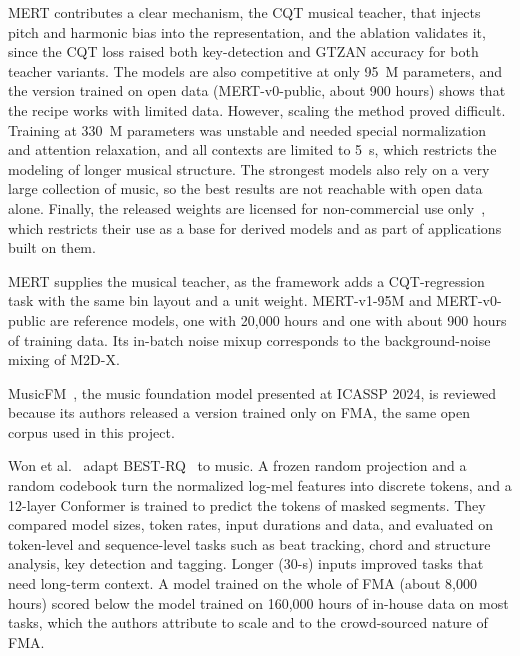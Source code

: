 \documentclass{FastFyp}
\begin{document}
\lrcritical
MERT contributes a clear mechanism, the CQT musical teacher, that injects pitch and harmonic bias into the representation, and the ablation validates it, since the CQT loss raised both key-detection and GTZAN accuracy for both teacher variants. The models are also competitive at only 95~M parameters, and the version trained on open data (MERT-v0-public, about 900 hours) shows that the recipe works with limited data. However, scaling the method proved difficult. Training at 330~M parameters was unstable and needed special normalization and attention relaxation, and all contexts are limited to 5~s, which restricts the modeling of longer musical structure. The strongest models also rely on a very large collection of music, so the best results are not reachable with open data alone. Finally, the released weights are licensed for non-commercial use only~\cite{ref:MERTCard}, which restricts their use as a base for derived models and as part of applications built on them.

\lrrelation
MERT supplies the musical teacher, as the framework adds a CQT-regression task with the same bin layout and a unit weight. MERT-v1-95M and MERT-v0-public are reference models, one with 20,000 hours and one with about 900 hours of training data. Its in-batch noise mixup corresponds to the background-noise mixing of M2D-X.

MusicFM~\cite{ref:Won:2024musicfm}, the music foundation model presented at ICASSP 2024, is reviewed because its authors released a version trained only on FMA, the same open corpus used in this project.

\lrsummary
Won et al.~\cite{ref:Won:2024musicfm} adapt BEST-RQ~\cite{ref:Chiu:2022bestrq} to music. A frozen random projection and a random codebook turn the normalized log-mel features into discrete tokens, and a 12-layer Conformer is trained to predict the tokens of masked segments. They compared model sizes, token rates, input durations and data, and evaluated on token-level and sequence-level tasks such as beat tracking, chord and structure analysis, key detection and tagging. Longer (30-s) inputs improved tasks that need long-term context. A model trained on the whole of FMA (about 8,000 hours) scored below the model trained on 160,000 hours of in-house data on most tasks, which the authors attribute to scale and to the crowd-sourced nature of FMA.
\end{document}
